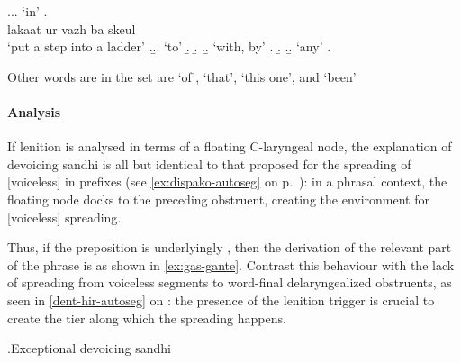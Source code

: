 \ex.\label{ex:devoicing-bothoa}\a.\a.\ipa{[ba]} `in'
\bg.\ipa{[ˈlakad̥}    \ipa{sʧøːl]}\\
lakaat ur vazh ba skeul\\
`put a step into a ladder'
\z.\b.\a.\ipa{[də]} `to'
\b.
\b.
\z.\b.\ipa{[ˈɡãnd̥]} `with, by'
\a.
\b.
\z.\b.\ipa{[bəˈnakəd̥]} `any'
\a.

Other words are in the set are \ipa{[dəz̥]} `of', \ipa{[zə]} `that', \ipa{[ˈzeː]} `this one', and \ipa{[bed̥]} `been'

\paragraph{Analysis}
\label{sec:analysis-5}

If lenition is analysed in terms of a floating C-laryngeal node, the explanation of devoicing sandhi is all but identical to that proposed for the spreading of [voiceless] in prefixes (see \ref{ex:dispako-autoseg} on p.~\pageref{ex:dispako-autoseg}): in a phrasal context, the floating node docks to the preceding obstruent, creating the environment for [voiceless] spreading.

Thus, if the preposition \ipa{[ɡãnd̥]} is underlyingly , then the derivation of the relevant part of the phrase  is as shown in \ref{ex:gas-gante}. Contrast this behaviour with the lack of spreading from voiceless segments to word-final delaryngealized obstruents, as seen in \ref{dent-hir-autoseg} on : the presence of the lenition trigger is crucial to create the tier along which the spreading happens.

\ex.\label{ex:gas-gante}Exceptional devoicing sandhi\\

